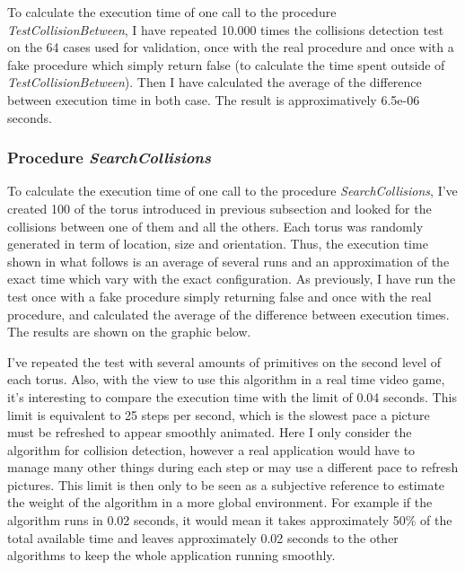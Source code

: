 \documentclass[12pt, a4paper]{article}
\begin{document}
To calculate the execution time of one call to the procedure {\em TestCollisionBetween}, I have repeated 10.000 times the collisions detection test on the 64 cases used for validation, once with the real procedure and once with a fake procedure which simply return false (to calculate the time spent outside of {\em TestCollisionBetween}). Then I have calculated the average of the difference between execution time in both case. The result is approximatively 6.5e-06 seconds.

\subsubsection{Procedure {\em SearchCollisions}}

To calculate the execution time of one call to the procedure {\em SearchCollisions}, I've created 100 of the torus introduced in previous subsection and looked for the collisions between one of them and all the others. Each torus was randomly generated in term of location, size and orientation. Thus, the execution time shown in what follows is an average of several runs and an approximation of the exact time which vary with the exact configuration. As previously, I have run the test once with a fake procedure simply returning false and once with the real procedure, and calculated the average of the difference between execution times. The results are shown on the graphic below.

I've repeated the test with several amounts of primitives on the second level of each torus. Also, with the view to use this algorithm in a real time video game, it's interesting to compare the execution time with the limit of 0.04 seconds. This limit is equivalent to 25 steps per second, which is the slowest pace a picture must be refreshed to appear smoothly animated. Here I only consider the algorithm for collision detection, however a real application would have to manage many other things during each step or may use a different pace to refresh pictures. This limit is then only to be seen as a subjective reference to estimate the weight of the algorithm in a more global environment. For example if the algorithm runs in 0.02 seconds, it would mean it takes approximately 50\% of the total available time and leaves approximately 0.02 seconds to the other algorithms to keep the whole application running smoothly. \\

\\
\end{document}
